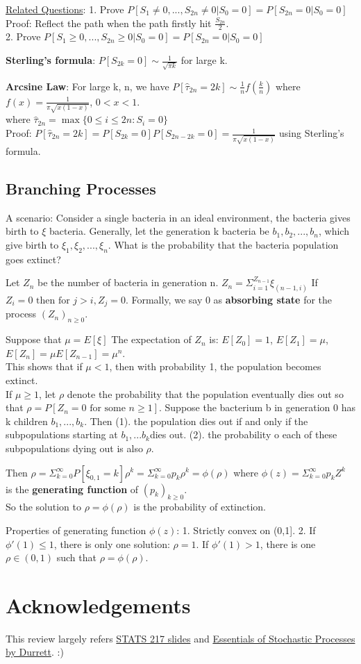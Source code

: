 \documentclass{article}
\begin{document}
\underline{Related Questions}: 1. Prove $P[S_1\neq0,...,S_{2n}\neq0|S_0=0] = P[S_{2n}=0|S_0=0]$\\
Proof: Reflect the path when the path firstly hit $\frac{S_{2n}}{2}$.\\
2. Prove $P[S_1\geq0,...,S_{2n}\geq0|S_0=0] = P[S_{2n}=0|S_0=0]$\par
\textbf{Sterling's formula}: $P[S_{2k}=0]\sim \frac{1}{\sqrt{\pi k}}$ for large k.\par
\textbf{Arcsine Law}: For large k, n, we have $P[\hat{\tau}_{2n}=2k]\sim \frac{1}{n}f(\frac{k}{n})$ where $f(x) = \frac{1}{\pi\sqrt{x(1-x)}}$, $0<x<1$.\\
where $\hat{\tau}_{2n}=\max\{0\leq i\leq 2n: S_i = 0\}$\\
Proof: $P[\hat{\tau}_{2n}=2k] = P[S_{2k}=0]P[S_{2n-2k}=0]=\frac{1}{\pi\sqrt{x(1-x)}}$ using Sterling's formula.

\subsection{Branching Processes}
A scenario: Consider a single bacteria in an ideal environment, the bacteria gives birth to $\xi$ bacteria. Generally, let the generation k bacteria be {$b_1, b_2,...,b_n$}, which give birth to $\xi_1,\xi_2,...,\xi_n$. What is the probability that the bacteria population goes extinct?\par
Let $Z_n$ be the number of bacteria in generation n. $Z_n = \Sigma_{i=1}^{Z_{n-1}}\xi_{(n-1,i)}$ If $Z_i=0\text{ then for } j>i, Z_j=0$. Formally, we say 0 as \textbf{absorbing state} for the process $(Z_n)_{n\geq0}$.\par
Suppose that $\mu = E[\xi]$ The expectation of $Z_n$ is: 
$E[Z_0]=1$, $E[Z_1] = \mu$, $E[Z_n]=\mu E[Z_{n-1}]=\mu^n$.\\
This shows that if $\mu < 1$, then with probability 1, the population becomes extinct.\\
If $\mu \geq 1$, let $\rho$ denote the probability that the population eventually dies out so that $\rho = P[Z_n=0 \text{ for some }n\geq1]$. Suppose the bacterium b in generation 0 has k children $b_1,...,b_k$. Then (1). the population dies out if and only if the subpopulations starting at $b_1,...b_k$dies out. (2). the probability o each of these subpopulations dying out is also $\rho$.\par
Then $\rho = \Sigma_{k=0}^{\infty}P[\xi_{0,1}=k]\rho^k=\Sigma_{k=0}^{\infty}p_k\rho^k = \phi(\rho)$ where $\phi(z) = \Sigma_{k=0}^{\infty}p_kZ^k$ is the \textbf{generating function} of $(p_k)_{k\geq0}$.\\
So the solution to $\rho = \phi(\rho)$ is the probability of extinction.\par
Properties of generating function $\phi(z)$: 1. Strictly convex on (0,1]. 2. If $\phi\prime(1)\leq1$, there is only one solution: $\rho = 1$. If $\phi\prime(1)>1$, there is one $\rho \in (0,1)$ such that $\rho = \phi(\rho)$.
\section{Acknowledgements}
This review largely refers \href{https://jainvishesh.github.io/STATS217_Winter2021.html}{STATS 217 slides} and \href{https://services.math.duke.edu/~rtd/EOSP/EOSP2E.pdf}{Essentials of Stochastic Processes by Durrett}.
:)
\end{document}
